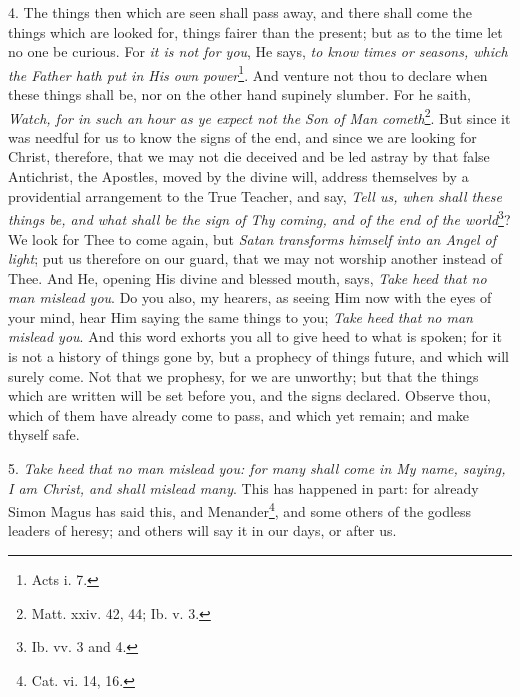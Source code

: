 4. The things then which are seen shall pass away, and there shall come the things which are looked for, things fairer than the present; but as to the time let no one be curious. For \emph{it is not for you}, He says, \emph{to know times or seasons, which the Father hath put in His own power}\footnote{Acts i. 7.}. And venture not thou to declare when these things shall be, nor on the other hand supinely slumber. For he saith, \emph{Watch, for in such an hour as ye expect not the Son of Man cometh}\footnote{Matt. xxiv. 42, 44; Ib. v. 3.}. But since it was needful for us to know the signs of the end, and since we are looking for Christ, therefore, that we may not die deceived and be led astray by that false Antichrist, the Apostles, moved by the divine will, address themselves by a providential arrangement to the True Teacher, and say, \emph{Tell us, when shall these things be, and what shall be the sign of Thy coming, and of the end of the world}\footnote{Ib. vv. 3 and 4.}? We look for Thee to come again, but \emph{Satan transforms himself into an Angel of light}; put us therefore on our guard, that we may not worship another instead of Thee. And He, opening His divine and blessed mouth, says, \emph{Take heed that no man mislead you}. Do you also, my hearers, as seeing Him now with the eyes of your mind, hear Him saying the same things to you; \emph{Take heed that no man mislead you}. And this word exhorts you all to give heed to what is spoken; for it is not a history of things gone by, but a prophecy of things future, and which will surely come. Not that we prophesy, for we are unworthy; but that the things which are written will be set before you, and the signs declared. Observe thou, which of them have already come to pass, and which yet remain; and make thyself safe.

5. \emph{Take heed that no man mislead you: for many shall come in My name, saying, I am Christ, and shall mislead many}. This has happened in part: for already Simon Magus has said this, and Menander\footnote{Cat. vi. 14, 16.}, and some others of the godless leaders of heresy; and others will say it in our days, or after us.

